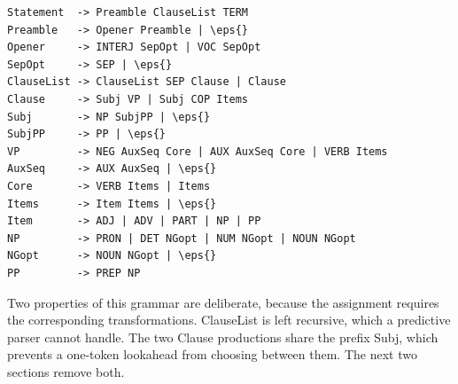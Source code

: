 \documentclass[11pt,a4paper]{article}
\newcommand{\vbfmt}{\color{ink!88}}
\newcommand{\eps}{\ensuremath{\varepsilon}}
\begin{document}
\begin{Verbatim}[commandchars=\\\{\},fontsize=\small,formatcom=\vbfmt,frame=leftline,framerule=1.2pt,rulecolor=\color{clay!55},framesep=6pt,xleftmargin=10pt,xrightmargin=4pt]
Statement  -> Preamble ClauseList TERM
Preamble   -> Opener Preamble | \eps{}
Opener     -> INTERJ SepOpt | VOC SepOpt
SepOpt     -> SEP | \eps{}
ClauseList -> ClauseList SEP Clause | Clause
Clause     -> Subj VP | Subj COP Items
Subj       -> NP SubjPP | \eps{}
SubjPP     -> PP | \eps{}
VP         -> NEG AuxSeq Core | AUX AuxSeq Core | VERB Items
AuxSeq     -> AUX AuxSeq | \eps{}
Core       -> VERB Items | Items
Items      -> Item Items | \eps{}
Item       -> ADJ | ADV | PART | NP | PP
NP         -> PRON | DET NGopt | NUM NGopt | NOUN NGopt
NGopt      -> NOUN NGopt | \eps{}
PP         -> PREP NP
\end{Verbatim}
Two properties of this grammar are deliberate, because the assignment requires the corresponding transformations. ClauseList is left recursive, which a predictive parser cannot handle. The two Clause productions share the prefix Subj, which prevents a one-token lookahead from choosing between them. The next two sections remove both.
\end{document}
